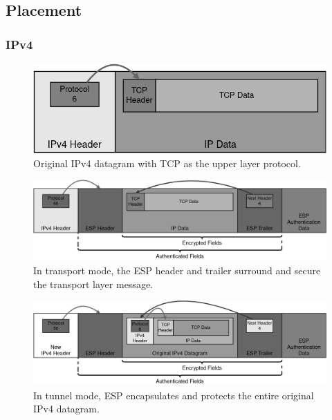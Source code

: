 \documentclass[a4paper,12pt]{report}
\begin{document}
		\newpage
		\subsection{Placement}
		\subsubsection{IPv4}
		
		\begin{figure}[h]
			\includegraphics[width=\textwidth,height=0.15\textheight,keepaspectratio]{original_ipv4_packet}
			\centering
			\caption{Original IPv4 datagram with TCP as the upper layer protocol.}
		\end{figure}
		
		\begin{figure}[h]
			\includegraphics[width=\textwidth]{esp_ipv4_transport}
			\centering
			\caption{In transport mode, the ESP header and trailer surround and secure the transport layer message.}
		\end{figure}
		
		\begin{figure}[!htb]
			\includegraphics[width=\textwidth]{esp_ipv4_tunnel}
			\centering
			\caption{In tunnel mode, ESP encapsulates and protects the entire original IPv4 datagram.}
		\end{figure}
\newpage
\end{document}
